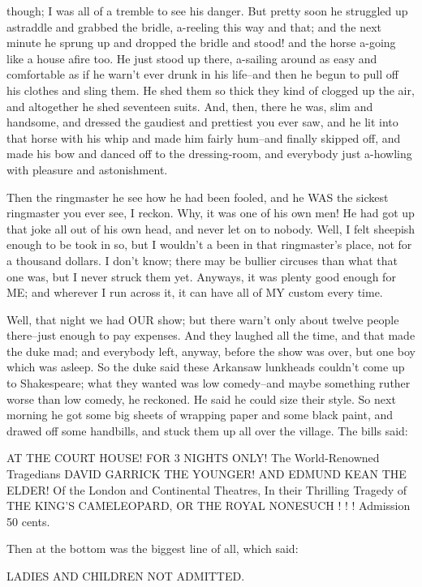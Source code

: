 though; I was all of a tremble to see his danger.  But pretty soon he
struggled up astraddle and grabbed the bridle, a-reeling this way and
that; and the next minute he sprung up and dropped the bridle and stood!
and the horse a-going like a house afire too.  He just stood up there,
a-sailing around as easy and comfortable as if he warn't ever drunk in his
life--and then he begun to pull off his clothes and sling them.  He shed
them so thick they kind of clogged up the air, and altogether he shed
seventeen suits. And, then, there he was, slim and handsome, and dressed
the gaudiest and prettiest you ever saw, and he lit into that horse with
his whip and made him fairly hum--and finally skipped off, and made his
bow and danced off to the dressing-room, and everybody just a-howling
with pleasure and astonishment.

Then the ringmaster he see how he had been fooled, and he WAS the sickest
ringmaster you ever see, I reckon.  Why, it was one of his own men!  He
had got up that joke all out of his own head, and never let on to nobody.
Well, I felt sheepish enough to be took in so, but I wouldn't a been in
that ringmaster's place, not for a thousand dollars.  I don't know; there
may be bullier circuses than what that one was, but I never struck them
yet. Anyways, it was plenty good enough for ME; and wherever I run across
it, it can have all of MY custom every time.

Well, that night we had OUR show; but there warn't only about twelve
people there--just enough to pay expenses.  And they laughed all the
time, and that made the duke mad; and everybody left, anyway, before the
show was over, but one boy which was asleep.  So the duke said these
Arkansaw lunkheads couldn't come up to Shakespeare; what they wanted was
low comedy--and maybe something ruther worse than low comedy, he
reckoned.  He said he could size their style.  So next morning he got
some big sheets of wrapping paper and some black paint, and drawed off
some handbills, and stuck them up all over the village.  The bills said:

AT THE COURT HOUSE! FOR 3 NIGHTS ONLY!
The World-Renowned Tragedians
DAVID GARRICK THE YOUNGER!
AND EDMUND KEAN THE ELDER!
Of the London and
Continental Theatres,
In their Thrilling Tragedy of
THE KING'S CAMELEOPARD,
OR THE ROYAL NONESUCH ! ! !
Admission 50 cents.

Then at the bottom was the biggest line of all, which said:

LADIES AND CHILDREN NOT ADMITTED.

